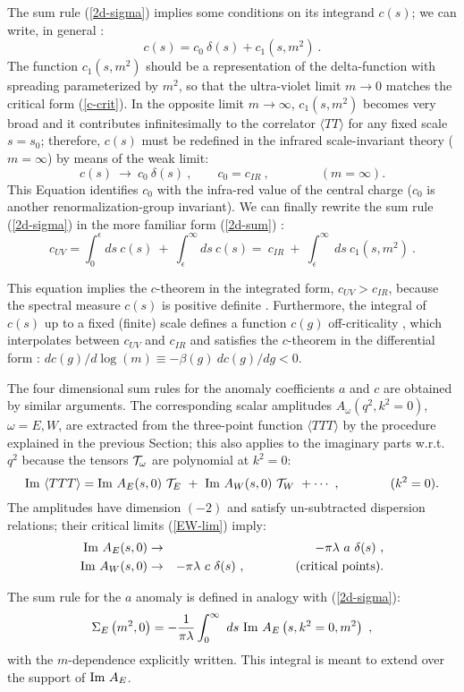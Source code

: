 \documentclass[11pt]{article}
\newcommand{\beq}{\begin{equation}}
\newcommand{\eeq}{\end{equation}}
\newcommand{\bea}{\begin{eqnarray}}
\newcommand{\eea}{\end{eqnarray}}
\def\eps{\epsilon}
\def\l{\lambda}
\def\o{\omega}
\def\Im{\hbox{\rm Im\ }}
\def\nl{\nonumber\\}
\def\TTT{\bra TTT\ket}
\def\bra{\langle}
\def\ket{\rangle}
\begin{document}
The sum rule (\ref{2d-sigma}) implies some
conditions on its integrand $c(s)$; we can write,
in general \cite{cfl}:
\beq
c(s) = c_0 \ \delta(s) + c_1 (s, m^2) \ .
\label{spec-exp}
\eeq
The function $c_1(s, m^2)$ should be a representation of 
the delta-function with spreading parameterized by $m^2$,
so that the ultra-violet limit $m\to 0$ matches the critical 
form (\ref{c-crit}).
In the opposite limit $m\to\infty$,
$c_1(s, m^2)$ becomes very broad and it contributes
infinitesimally to the correlator $\bra TT \ket$ for any fixed scale $s=s_0$;
therefore, $c(s)$ must be redefined in the infrared scale-invariant 
theory ($m=\infty$) by means of the weak limit:
\beq
c(s) \ \to \ c_0 \ \delta(s)\ , \qquad c_0=c_{IR}\ , \qquad\qquad
(m=\infty).
\label{spec-ir}
\eeq
This Equation identifies $c_0$ with the infra-red value of the central charge
($c_0$ is another renormalization-group invariant).
We can finally rewrite the sum rule (\ref{2d-sigma}) 
in the more familiar form (\ref{2d-sum}) \cite{sumrule}:
\beq
c_{UV} =\int_0^\eps ds\ c(s) \ +\ \int_\eps^\infty ds\ c(s) =
\ c_{IR}\ +\ \int_\eps^\infty\ ds\ c_1(s,m^2) \ .
\label{2d-sum1}
\eeq

This equation implies the $c$-theorem in the integrated form,
$c_{UV} > c_{IR}$, because
the spectral measure $c(s)$ is positive definite \cite{sumrule}.
Furthermore, the integral of $c(s)$ up to a fixed (finite) scale 
defines a function $c(g)$ off-criticality  \cite{cfl}, 
which interpolates between $c_{UV}$ and $c_{IR}$
and satisfies the $c$-theorem in the differential form \cite{cth}:
$dc(g)/d\log(m) \equiv - \beta(g)\ dc(g)/dg <0$.

\bigskip

The four dimensional sum rules for the anomaly coefficients
$a$ and $c$ are obtained by similar arguments.
The corresponding scalar amplitudes $A_\o(q^2,k^2=0)$, $\o=E,W$, 
are extracted from the three-point function $\TTT$ by the
procedure explained in the previous Section; this also applies to the
imaginary parts w.r.t. $q^2$
because the tensors ${\cal T}_\o$ are polynomial at $k^2=0$:
\beq
\Im \TTT = \Im A_E(s,0) \ {\cal T}_E \ +
         \ \Im A_W(s,0) \ {\cal T}_W \ + \cdots\ ,
\qquad\qquad (k^2=0).
\label{3t-im}
\eeq
The amplitudes have dimension $(-2)$ and satisfy 
un-subtracted dispersion relations; their critical limits (\ref{EW-lim})
imply:
\bea
\Im A_E(s,0) & \to & -\pi\l \ a\ \delta(s)\ ,\nl
\Im A_W(s,0) & \to & -\pi\l \ c\ \delta(s)\ , \qquad\qquad
({\rm critical\ points}).
\label{ac-crit}
\eea

The sum rule for the $a$ anomaly is defined in analogy with (\ref{2d-sigma}):
\beq
\Sigma_E\left(m^2,0\right) = - \frac{1}{\pi\l} 
\int_0^\infty\ ds\ \Im A_E \left(s,k^2=0,m^2 \right)\ ,
\label{a-sum}
\eeq
with the $m$-dependence explicitly written. 
This integral is meant to extend over the support of $\Im A_E$.
\end{document}
